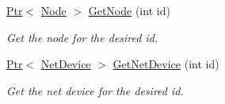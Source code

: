 \begin{DoxyCompactItemize}
\hyperlink{classns3_1_1Ptr}{Ptr}$<$ \hyperlink{classns3_1_1Node}{Node} $>$ \hyperlink{classns3_1_1BsmApplication_a3007f596cbc6078a237ad4f4c7c3c743}{Get\+Node} (int id)
\begin{DoxyCompactList}\small\item\em Get the node for the desired id. \end{DoxyCompactList}\item 
\hyperlink{classns3_1_1Ptr}{Ptr}$<$ \hyperlink{classns3_1_1NetDevice}{Net\+Device} $>$ \hyperlink{classns3_1_1BsmApplication_a0db360e7cd84744a0e4b85a351b13659}{Get\+Net\+Device} (int id)
\begin{DoxyCompactList}\small\item\em Get the net device for the desired id. \end{DoxyCompactList}\end{DoxyCompactItemize}
